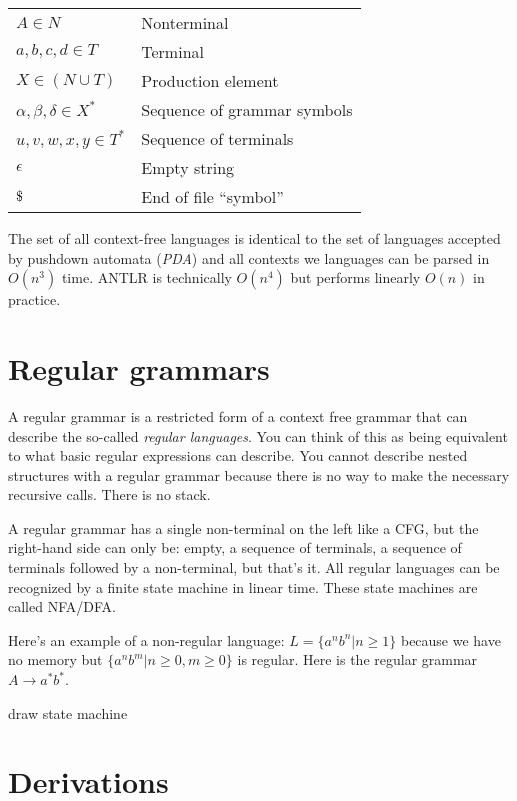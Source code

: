 \documentclass[11pt,twocolumn,nocopyright]{sigplanconf}
\begin{document}
\begin{center}\small 
\begin{tabular}{l  l}
$A  \in N$		    & Nonterminal \\
$a,b,c,d  \in T$ 	    & Terminal \\
$X  \in (N \cup T)  $ & Production element \\
$\alpha, \beta, \delta \in X^*$  & Sequence of grammar symbols\\
$u,v,w,x,y \in T^*$             & Sequence of terminals\\
$\epsilon$ & Empty string \\
$\char36$ & End of file ``symbol'' \\
\end{tabular}
\end{center}

The set of all context-free languages is identical to the set of languages accepted by pushdown automata ({\em PDA}) and all contexts we languages can be parsed in $O(n^3)$ time.  ANTLR is technically $O(n^4)$ but performs linearly $O(n)$ in practice.

\section{Regular grammars}

A regular grammar is a restricted form of a context free grammar that can describe the so-called {\em regular languages}. You can think of this as being equivalent to what basic regular expressions can describe.  You cannot describe nested structures with a regular grammar because there is no way to make the necessary recursive calls. There is no stack.

A regular grammar has a single non-terminal on the left like a CFG, but the right-hand side can only be: empty, a sequence of terminals, a sequence of terminals followed by a non-terminal, but that's it. All regular languages can be recognized by a finite state machine in linear time.  These state machines are called NFA/DFA.

Here's an example of a non-regular language: $L = \{a^nb^n | n \ge 1\}$ because we have no memory but $\{a^nb^m | n \ge 0, m \ge 0\}$ is regular. Here is the regular grammar $A \rightarrow a^* b^*$.

draw state machine
 
\section{Derivations}
\end{document}
